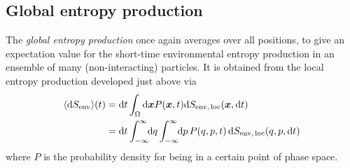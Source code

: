 \subsection{Global entropy production}
\label{sec:global entropy production}

The \emph{global entropy production} once again averages over all positions, to give an expectation value for the short-time environmental entropy production in an ensemble of many (non-interacting) particles. It is obtained from the local entropy production developed just above via
%
\begin{equation}\begin{split}
	\label{eqn:global entropy production}
	\langle\mathrm{d}S_\text{env}\rangle(t)
	&= \mathrm{d} t \int_\Omega \mathrm{d}\boldsymbol{x} P(\boldsymbol{x}, t)\mathrm{d}S_\text{env,\,loc}(\boldsymbol{x}, \mathrm{d} t) \\
	&= \mathrm{d} t \int_{-\infty}^\infty\!\!\mathrm{d} q\int_{-\infty}^\infty\!\!\mathrm{d} p\, P(q, p, t) \, \mathrm{d}S_\text{env,\,loc}(q, p, \mathrm{d} t)
\end{split}\end{equation}
%
where \(P\) is the probability density for being in a certain point of phase space.


